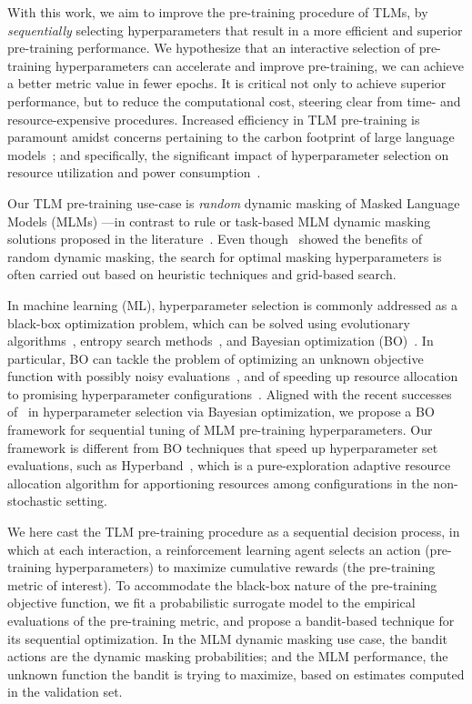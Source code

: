 With this work, we aim to improve the pre-training procedure of TLMs,
by \textit{sequentially} selecting hyperparameters that result in a more efficient and superior pre-training performance.
%
We hypothesize that an interactive selection of pre-training hyperparameters can accelerate and improve pre-training,
\ie we can achieve a better metric value in fewer epochs.
It is critical not only to achieve superior performance,
but to reduce the computational cost,
steering clear from time- and resource-expensive procedures.
Increased efficiency in TLM pre-training is paramount
amidst concerns pertaining to the carbon footprint of large language models~\citep{patterson2021carbon};
and specifically, the significant impact of hyperparameter selection
on resource utilization and power consumption~\citep{puvis-de-chavannes-etal-2021-hyperparameter}.

Our TLM pre-training use-case is \textit{random} dynamic masking of Masked Language Models (MLMs)
---in contrast to rule or task-based MLM dynamic masking solutions proposed in the literature~\citep{spanbert,ernie}.
Even though~\citet{roberta} showed the benefits of random dynamic masking,
the search for optimal masking hyperparameters is often carried out based on heuristic techniques and grid-based search.

In machine learning (ML), hyperparameter selection is commonly addressed as a black-box optimization problem,
which can be solved using
evolutionary algorithms~\citep{b-evolutionaryalgos},
entropy search methods~\citep{j-Hennig2012,ip-Hernandez-Lobato2014},
and Bayesian optimization (BO)~\citep{j-Frazier2018}.
In particular, BO can tackle the problem of optimizing an unknown objective function with possibly noisy evaluations~\citep{ip-Snoek2012},
and of speeding up resource allocation to promising hyperparameter configurations~\citep{hyperband}.
Aligned with the recent successes of~\citet{j-turner2021bayesian} in hyperparameter selection via Bayesian optimization,
we propose a BO framework for sequential tuning of MLM pre-training hyperparameters.
Our framework is different from BO techniques that speed up hyperparameter set evaluations,
such as Hyperband~\citep{hyperband}, which is a pure-exploration adaptive resource allocation algorithm
for apportioning resources among configurations in the non-stochastic setting.

We here cast the TLM pre-training procedure as a sequential decision process,
in which at each interaction, a reinforcement learning agent
selects an action (\eg pre-training hyperparameters) to maximize cumulative rewards (\eg the pre-training metric of interest).
%
To accommodate the black-box nature of the pre-training objective function,
we fit a probabilistic surrogate model to the empirical evaluations of the pre-training metric,
and propose a bandit-based technique for its sequential optimization.
In the MLM dynamic masking use case, the bandit actions are the dynamic masking probabilities;
and the MLM performance, the unknown function the bandit is trying to maximize,
based on estimates computed in the validation set.

